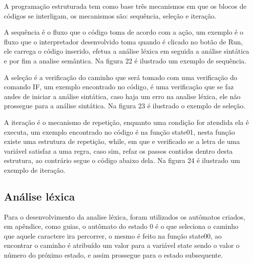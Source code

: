 \documentclass[12pt,oneside,a4paper,chapter=TITLE,section=TITLE,sumario=tradicional]{abntex2}
\begin{document}
A programação estruturada tem como base três mecanismos em que os blocos de códigos se interligam, os mecanismos são: sequência, seleção e iteração\cite{ivan2003}.

A sequência é o fluxo que o código toma de acordo com a ação\cite{ivan2003}, um exemplo é o fluxo que o interpretador desenvolvido toma quando é clicado no botão de Run, ele carrega o código inserido, efetua a análise léxica em seguida a análise sintática e por fim a analise semântica. Na figura 22 é ilustrado um exemplo de sequência.

\begin{figure}[htb]
\end{figure}

A seleção é a verificação do caminho que será tomado com uma verificação do comando IF\cite{ivan2003}, um exemplo encontrado no código, é uma verificação que se faz andes de iniciar a análise sintática, caso haja um erro na analise léxica, ele não prossegue para a análise sintática. Na figura 23 é ilustrado o exemplo de seleção.

\begin{figure}[htb]
\end{figure}

A iteração é o mecanismo de repetição, enquanto uma condição for atendida ela é executa\cite{ivan2003}, um exemplo encontrado no código é na função state01, nesta função existe uma estrutura de repetição, while, em que e verificado se a letra de uma variável satisfaz a uma regra, caso sim, refaz os passos contidos dentro desta estrutura, ao contrário segue o código abaixo dela. Na figura 24 é ilustrado um exemplo de iteração.

\begin{figure}[htb]
\end{figure}

\subsection{Análise léxica}
\label{subsec:analiselexica}

Para o desenvolvimento da analise léxica, foram utilizados os autômatos criados, em apêndice, como guias, o autômato do estado 0 é o que seleciona o caminho que aquele caractere ira percorrer, o mesmo é feito na função state00, ao encontrar o caminho é atribuído um valor para a variável state sendo o valor o número do próximo estado, e assim prossegue para o estado subsequente.
\end{document}

